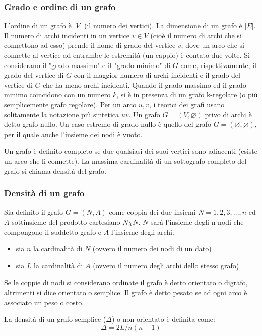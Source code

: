 \subsubsection{Grado e ordine di un grafo}

L'ordine di un grafo \cite{GrafoOrdine} è $|V|$ (il numero dei vertici). La dimensione di un grafo è $|E|$. Il numero di archi incidenti in un vertice $v \in V$ (cioè il numero di archi che si connettono ad esso) prende il nome di grado del vertice $v$, dove un arco che si connette al vertice ad entrambe le estremità (un cappio) è contato due volte.
Si considerano il "grado massimo" e il "grado minimo" di $G$ come, rispettivamente, il grado del vertice di $G$ con il maggior numero di archi incidenti e il grado del vertice di $G$ che ha meno archi incidenti. Quando il grado massimo ed il grado minimo coincidono con un numero $k$, si è in presenza di un grafo k-regolare (o più semplicemente grafo regolare).
Per un arco ${u, v}$, i teorici dei grafi usano solitamente la notazione più sintetica $uv$.
Un grafo $G=(V,\varnothing)$ privo di archi è detto grafo nullo. Un caso estremo di grado nullo è quello del grafo $G=(\varnothing,\varnothing)$, per il quale anche l'insieme dei nodi è vuoto.

Un grafo è definito completo se due qualsiasi dei suoi vertici sono adiacenti (esiste un arco che li connette). La massima cardinalità di un sottografo completo del grafo si chiama densità del grafo.

\subsubsection{Densità di un grafo}

Sia definito il grafo $G=(N,A)$ come coppia dei due insiemi $N={1,2,3,...,n}$ ed $A$ sottinsieme del prodotto cartesiano $N \chi N$. $N$ sarà l'insieme degli n nodi che compongono il suddetto grafo e $A$ l'insieme degli archi.
\begin{itemize}
    \item sia $n$ la cardinalità di $N$ (ovvero il numero dei nodi di un dato)
    \item sia $L$ la cardinalità di $A$ (ovvero il numero degli archi dello stesso grafo)
\end{itemize}
Se le coppie di nodi si considerano ordinate il grafo è detto orientato o digrafo, altrimenti si dice orientato o semplice. Il grafo è detto pesato se ad ogni arco è associato un peso o costo.

La densità di un grafo semplice ($\Delta$) o non orientato è definita come:
\begin{equation}
    \Delta = 2L/n(n-1)
\end{equation}

